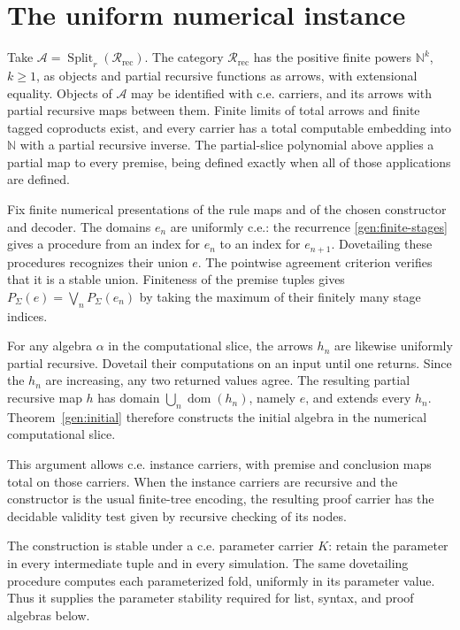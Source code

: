\documentclass[11pt]{article}
\theoremstyle{definition}
\theoremstyle{remark}
\newcommand{\R}{\mathscr R}
\newcommand{\N}{\mathbb N}
\begin{document}
\section{The uniform numerical instance}\label{gen:numerical}

Take $\mathscr A=\operatorname{Split}_r(\R_{\mathrm{rec}})$.
The category $\R_{\mathrm{rec}}$ has the positive finite powers
$\N^k$, $k\ge1$, as objects and partial recursive functions as arrows,
with extensional equality.
Objects of $\mathscr A$ may be identified with c.e. carriers, and
its arrows with partial recursive maps between them. Finite limits of
total arrows and finite tagged coproducts
exist, and every carrier has a total computable embedding into $\N$
with a partial recursive inverse. The partial-slice polynomial above
applies a partial map to every premise, being defined exactly when all
of those applications are defined.

Fix finite numerical presentations of the rule maps and of the chosen
constructor and decoder. The domains $e_n$ are uniformly c.e.: the
recurrence \eqref{gen:finite-stages} gives a procedure from an index
for $e_n$ to an index for $e_{n+1}$. Dovetailing these procedures
recognizes their union $e$. The pointwise agreement criterion verifies
that it is a stable union. Finiteness of the premise tuples gives
$P_\Sigma(e)=\bigvee_nP_\Sigma(e_n)$ by taking the maximum of their
finitely many stage indices.

For any algebra $\alpha$ in the computational slice, the arrows $h_n$
are likewise uniformly partial recursive. Dovetail their computations
on an input until one returns. Since the $h_n$ are increasing, any two
returned values agree. The resulting partial recursive map $h$ has
domain $\bigcup_n\operatorname{dom}(h_n)$, namely $e$, and extends
every $h_n$. Theorem~\ref{gen:initial} therefore constructs the
initial algebra in the numerical computational slice.

This argument allows c.e. instance carriers, with premise and conclusion
maps total on those carriers. When the instance carriers are recursive
and the constructor is the usual finite-tree encoding, the resulting
proof carrier has the decidable validity test given by recursive checking
of its nodes.

The construction is stable under a c.e. parameter carrier $K$: retain
the parameter in every intermediate tuple and in every simulation.
The same dovetailing procedure computes each parameterized fold,
uniformly in its parameter value. Thus it supplies the parameter
stability required for list, syntax, and proof algebras below.
\end{document}
